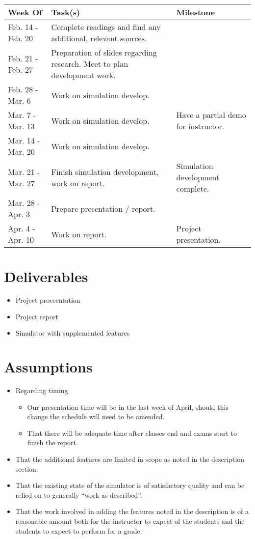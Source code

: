 \documentclass{article}
\begin{document}
\begin{center}
  \begin{tabular}{l|p{8cm}|p{3cm}}
    Week Of & Task(s) & Milestone \\
    \hline
    Feb. 14 - Feb. 20 & Complete readings and find any additional, relevant sources. & \\
    Feb. 21 - Feb. 27 & Preparation of slides regarding research. Meet to plan development work. & \\
    Feb. 28 - Mar. 6 & Work on simulation develop. & \\
    Mar. 7 - Mar. 13 & Work on simulation develop. & Have a partial demo for instructor. \\
    Mar. 14 - Mar. 20 & Work on simulation develop. & \\
    Mar. 21 - Mar. 27 & Finish simulation development, work on report. & Simulation development complete. \\
    Mar. 28 - Apr. 3 & Prepare presentation / report. & \\
    Apr. 4 - Apr. 10 & Work on report. & Project presentation. \\
  \end{tabular}
\end{center}

\section{Deliverables}

\begin{itemize}
\item Project proesentation
\item Project report
\item Simulator with supplemented features
\end{itemize}

\section{Assumptions}

\begin{itemize}
\item Regarding timing
  \begin{itemize}
  \item Our presentation time will be in the last week of April,
    should this change the schedule will need to be amended.
  \item That there will be adequate time after classes end and exams
    start to finish the report.
  \end{itemize}
\item That the additional features are limited in scope as noted in
  the description section.

\item That the existing state of the simulator is of satisfactory
  quality and can be relied on to generally “work as described”.

\item That the work involved in adding the features noted in the
  description is of a reasonable amount both for the instructor to
  expect of the students and the students to expect to perform for a
  grade.
\end{itemize}
\end{document}
